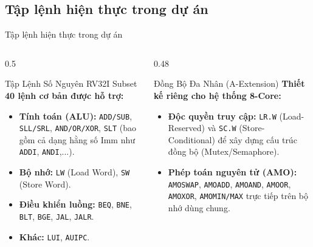 \subsection{Tập lệnh hiện thực trong dự án}
\begin{frame}{Tập lệnh hiện thực trong dự án}
    \begin{columns}
        \begin{column}{0.5\textwidth}
            \begin{block}{Tập Lệnh Số Nguyên RV32I Subset}
                \textbf{40 lệnh cơ bản được hỗ trợ:}
                \begin{itemize}
                    \item \textbf{Tính toán (ALU):} \texttt{ADD/SUB}, \texttt{SLL/SRL}, \texttt{AND/OR/XOR}, \texttt{SLT} (bao gồm cả dạng hằng số Imm như \texttt{ADDI}, \texttt{ANDI},...).
                    \item \textbf{Bộ nhớ:} \texttt{LW} (Load Word), \texttt{SW} (Store Word).
                    \item \textbf{Điều khiển luồng:} \texttt{BEQ}, \texttt{BNE}, \texttt{BLT}, \texttt{BGE}, \texttt{JAL}, \texttt{JALR}.
                    \item \textbf{Khác:} \texttt{LUI}, \texttt{AUIPC}.
                \end{itemize}
            \end{block}
        \end{column}
        
        \begin{column}{0.48\textwidth}
            \begin{alertblock}{Đồng Bộ Đa Nhân (A-Extension)}
                \textbf{Thiết kế riêng cho hệ thống 8-Core:}
                \begin{itemize}
                    \item \textbf{Độc quyền truy cập:} \texttt{LR.W} (Load-Reserved) và \texttt{SC.W} (Store-Conditional) để xây dựng cấu trúc đồng bộ (Mutex/Semaphore).
                    \item \textbf{Phép toán nguyên tử (AMO):} \texttt{AMOSWAP}, \texttt{AMOADD}, \texttt{AMOAND}, \texttt{AMOOR}, \texttt{AMOXOR}, \texttt{AMOMIN/MAX} trực tiếp trên bộ nhớ dùng chung.
                \end{itemize}
            \end{alertblock}
        \end{column}
    \end{columns}
\end{frame}